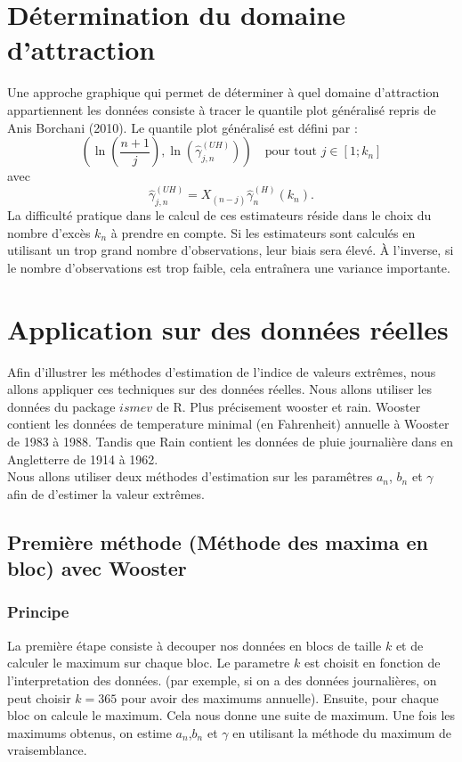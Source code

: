 \documentclass{article}
\begin{document}
\section{Détermination du domaine d'attraction}
Une approche graphique qui permet de déterminer à quel domaine d'attraction appartiennent les données consiste à tracer le quantile plot généralisé repris de Anis Borchani (2010). Le quantile plot généralisé est défini par :
\[
\left( \ln\left( \frac{n+1}{j} \right), \ln\left( \hat{\gamma}_{j,n}^{(UH)} \right) \right) \quad \text{pour tout } j \in \left[ 1; k_n \right]
\]
avec 
\[
\hat{\gamma}_{j,n}^{(UH)} = X_{(n-j)} \hat{\gamma}_{n}^{(H)}(k_n).
\]
La difficulté pratique dans le calcul de ces estimateurs réside dans le choix du nombre d'excès \(k_n\) à prendre en compte. Si les estimateurs sont calculés en utilisant un trop grand nombre d'observations, leur biais sera élevé. À l'inverse, si le nombre d'observations est trop faible, cela entraînera une variance importante.
\newpage
\section{Application sur des données réelles}

Afin d'illustrer les méthodes d'estimation de l'indice de valeurs extrêmes, nous allons appliquer ces techniques sur des données réelles.
Nous allons utiliser les données du package $ismev$ de R. Plus précisement wooster et rain. Wooster contient les données
de temperature minimal (en Fahrenheit) annuelle à Wooster de 1983 à 1988.
Tandis que Rain contient les données de pluie journalière dans en Angletterre de 1914 à 1962.
\\
Nous allons utiliser deux méthodes d'estimation sur les paramêtres $a_n$, $b_n$ et $\gamma$ afin de d'estimer la valeur extrêmes.

\subsection{Première méthode (Méthode des maxima en bloc) avec Wooster}
\subsubsection{Principe}

La première étape consiste à decouper nos données en blocs de taille $k$ et de calculer le maximum sur chaque bloc. Le parametre
$k$ est choisit en fonction de l'interpretation des données. (par exemple, si on a des données journalières, on peut choisir $k=365$ pour avoir des maximums annuelle).
Ensuite, pour chaque bloc on calcule le maximum. Cela nous donne une suite de maximum.
Une fois les maximums obtenus, on estime $a_n$,$b_n$ et $\gamma$ en utilisant la méthode du maximum de vraisemblance.
\end{document}
